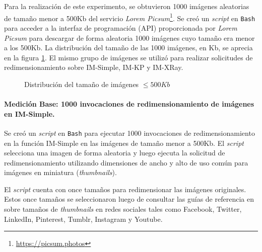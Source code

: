 Para la realización de este experimento, se obtuvieron 1000 imágenes aleatorias de tamaño menor a 500Kb del servicio \emph{Lorem Picsum}\footnote{\url{https://picsum.photos}}. Se creó un \emph{script} en \texttt{Bash} para acceder a la interfaz de programación (API) proporcionada por \emph{Lorem Picsum} para descargar de forma aleatoria 1000 imágenes cuyo tamaño era menor a los 500Kb. La distribución del tamaño de las 1000 imágenes, en Kb, se aprecia en la figura \ref{fig:distribucion-tamanno-imagenes-hasta-500kb}. El mismo grupo de imágenes se utilizó para realizar solicitudes de redimensionamiento sobre IM-Simple, IM-KP y IM-XRay.

\begin{figure}
\hspace{-1cm}
\caption{Distribución del tamaño de imágenes $\leq 500Kb$}
\label{fig:distribucion-tamanno-imagenes-hasta-500kb}
\end{figure}

\paragraph{Medición Base: 1000 invocaciones de redimensionamiento de imágenes en IM-Simple.} 
Se creó un \emph{script} en \texttt{Bash} para ejecutar 1000 invocaciones de redimensionamiento en la función IM-Simple en las imágenes de tamaño menor a 500Kb. El \emph{script} selecciona una imagen de forma aleatoria y luego ejecuta la solicitud de redimensionamiento utilizando dimensiones de ancho y alto de uso común para imágenes en miniatura (\emph{thumbnails}).

El \emph{script} cuenta con once tamaños para redimensionar las imágenes originales. Estos once tamaños se seleccionaron luego de consultar las guías de referencia en \cite{thumbnail-ref-1, thumbnail-ref-2} sobre tamaños de \emph{thumbnails} en redes sociales tales como Facebook, Twitter, LinkedIn, Pinterest, Tumblr, Instagram y Youtube.

